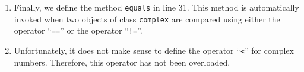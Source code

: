\begin{enumerate}
\item Finally, we define the method \texttt{equals} in line 31.  This method is automatically
      invoked when two objects of class \texttt{complex} are compared using either the
      operator ``\texttt{==}'' or the operator ``\texttt{!=}''.
\item Unfortunately, it does not make sense to define the operator ``\texttt{<}'' for complex
      numbers.  Therefore, this operator has not been overloaded.
\end{enumerate}


                
 
